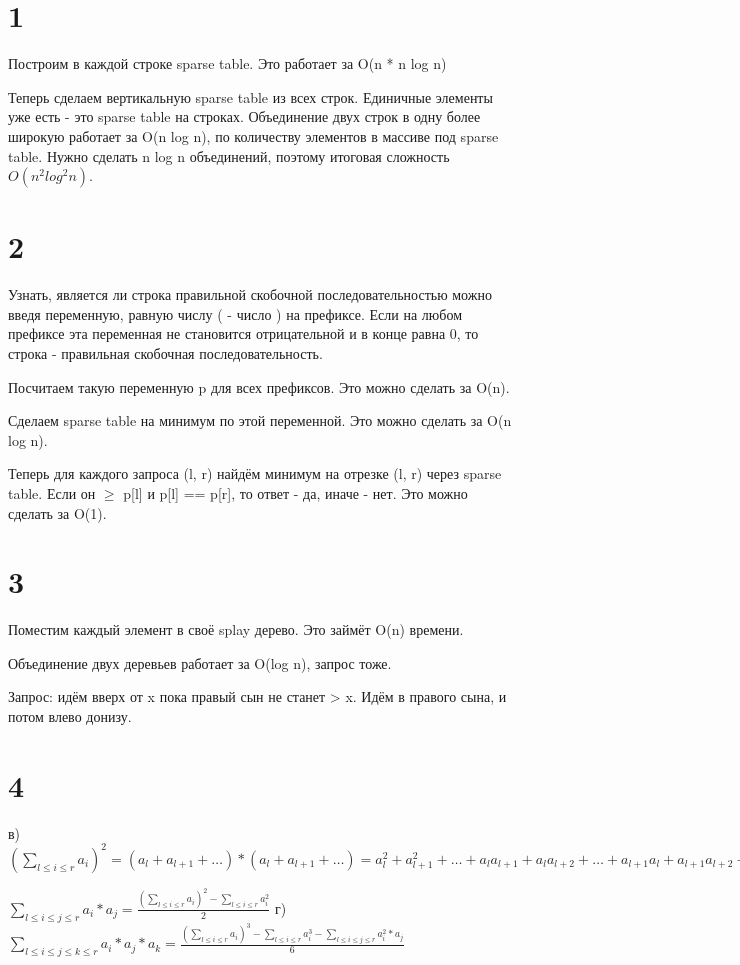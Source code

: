 \documentclass[12pt]{extarticle}
\begin{document}
\section*{1}
Построим в каждой строке sparse table. Это работает за O(n * n log n)

Теперь сделаем вертикальную sparse table из всех строк. Единичные элементы уже есть - это sparse table на строках. Объединение двух строк в одну более широкую работает за O(n log n), по количеству элементов в массиве под sparse table. Нужно сделать n log n объединений, поэтому итоговая сложность $O(n^2 log^2 n)$.

\section*{2}
Узнать, является ли строка правильной скобочной последовательностью можно введя переменную, равную числу ( - число ) на префиксе. Если на любом префиксе эта переменная не становится отрицательной и в конце равна 0, то строка - правильная скобочная последовательность.

Посчитаем такую переменную p для всех префиксов. Это можно сделать за O(n).

Сделаем sparse table на минимум по этой переменной. Это можно сделать за O(n log n).

Теперь для каждого запроса (l, r) найдём минимум на отрезке (l, r) через sparse table. Если он $\ge$ p[l] и p[l] == p[r], то ответ - да, иначе - нет. Это можно сделать за O(1).

\section*{3}
Поместим каждый элемент в своё splay дерево. Это займёт O(n) времени.

Объединение двух деревьев работает за O(log n), запрос тоже.

Запрос: идём вверх от x пока правый сын не станет > x. Идём в правого сына, и потом влево донизу.

\section*{4}
в) $(\sum\limits_{l \le i \le r} a_i) ^ 2 = (a_l + a_{l + 1} + \dots) * (a_l + a_{l + 1} + \dots) = a_l^2 + a_{l + 1}^2 + \dots + a_l a_{l + 1} + a_l a_{l + 2} + \dots + a_{l + 1} a_l + a_{l + 1} a_{l + 2} + \dots$ 

$\sum\limits_{l \le i \le j \le r} a_i * a_j = \frac{(\sum\limits_{l \le i \le r} a_i) ^ 2 - \sum\limits_{l \le i \le r} a_i^2}{2}$
\newline
г) $\sum\limits_{l \le i \le j \le k \le r} a_i * a_j * a_k = \frac{(\sum\limits_{l \le i \le r} a_i) ^ 3 - \sum\limits_{l \le i \le r} a_i^3 - \sum\limits_{l \le i \le j \le r} a_i^2 * a_j}{6}$
\end{document}
